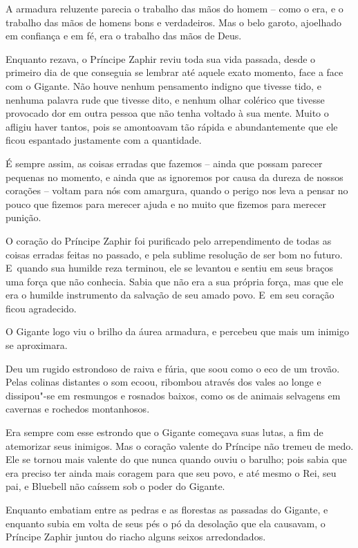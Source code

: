 A armadura reluzente parecia o trabalho das mãos do homem -- como o era,
e o trabalho das mãos de homens bons e verdadeiros. Mas o belo garoto,
ajoelhado em confiança e em fé, era o trabalho das mãos de Deus.

Enquanto rezava, o Príncipe Zaphir reviu toda sua vida passada, desde o
primeiro dia de que conseguia se lembrar até aquele exato momento, face
a face com o Gigante. Não houve nenhum pensamento indigno que tivesse
tido, e nenhuma palavra rude que tivesse dito, e nenhum olhar colérico
que tivesse provocado dor em outra pessoa que não tenha voltado à sua
mente. Muito o afligiu haver tantos, pois se amontoavam tão rápida e
abundantemente que ele ficou espantado justamente com a quantidade.

É sempre assim, as coisas erradas que fazemos -- ainda que possam
parecer pequenas no momento, e ainda que as ignoremos por causa da
dureza de nossos corações -- voltam para nós com amargura, quando o
perigo nos leva a pensar no pouco que fizemos para merecer ajuda e no
muito que fizemos para merecer punição.

O coração do Príncipe Zaphir foi purificado pelo arrependimento de todas
as coisas erradas feitas no passado, e pela sublime resolução de ser bom
no futuro. E~quando sua humilde reza terminou, ele se levantou e sentiu
em seus braços uma força que não conhecia. Sabia que não era a sua
própria força, mas que ele era o humilde instrumento da salvação de seu
amado povo. E~em seu coração ficou agradecido.

O Gigante logo viu o brilho da áurea armadura, e percebeu que mais um
inimigo se aproximara.

Deu um rugido estrondoso de raiva e fúria, que soou como o eco de um
trovão. Pelas colinas distantes o som ecoou, ribombou através dos vales
ao longe e dissipou"-se em resmungos e rosnados baixos, como os de
animais selvagens em cavernas e rochedos montanhosos.

Era sempre com esse estrondo que o Gigante começava suas lutas, a fim de
atemorizar seus inimigos. Mas o coração valente do Príncipe não tremeu
de medo. Ele se tornou mais valente do que nunca quando ouviu o barulho;
pois sabia que era preciso ter ainda mais coragem para que seu povo, e
até mesmo o Rei, seu pai, e Bluebell não caíssem sob o poder do Gigante.

Enquanto embatiam entre as pedras e as florestas as passadas do Gigante,
e enquanto subia em volta de seus pés o pó da desolação que ela causavam, o
Príncipe Zaphir juntou do riacho alguns seixos arredondados.

